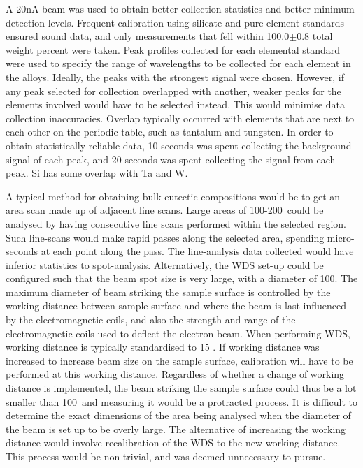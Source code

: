 A 20nA beam was used to obtain better collection statistics and better minimum detection levels.  Frequent calibration using silicate and pure element standards ensured sound data, and only measurements that fell within 100.0$\pm$0.8 total weight percent were taken.  Peak profiles collected for each elemental standard were used to specify the range of wavelengths to be collected for each element in the alloys.  Ideally, the peaks with the strongest signal were chosen.  However, if any peak selected for collection overlapped with another, weaker peaks for the elements involved would have to be selected instead.  This would minimise data collection inaccuracies.  Overlap typically occurred with elements that are next to each other on the periodic table, such as tantalum and tungsten.  In order to obtain statistically reliable data, 10 seconds was spent collecting the background signal of each peak, and 20 seconds was spent collecting the signal from each peak.  Si has some overlap with Ta and W. 

A typical method for obtaining bulk eutectic compositions would be to get an area scan made up of adjacent line scans.  Large areas of 100-200\micro\square\metre\ could be analysed by having consecutive line scans performed within the selected region.  Such line-scans would make rapid passes along the selected area, spending micro-seconds at each point along the pass.  The line-analysis data collected would have inferior statistics to spot-analysis.  Alternatively, the WDS set-up could be configured such that the beam spot size is very large, with a diameter of 100\micro\metre.  The maximum diameter of beam striking the sample surface is controlled by the working distance between sample surface and where the beam is last influenced by the electromagnetic coils, and also the strength and range of the electromagnetic coils used to deflect the electron beam.  When performing WDS, working distance is typically standardised to 15 \centi\metre.  If working distance was increased to increase beam size on the sample surface, calibration will have to be performed at this working distance.  Regardless of whether a change of working distance is implemented, the beam striking the sample surface could thus be a lot smaller than 100\micro\metre\ and measuring it would be a protracted process.  It is difficult to determine the exact dimensions of the area being analysed when the diameter of the beam is set up to be overly large.  The alternative of increasing the working distance would involve recalibration of the WDS to the new working distance.  This process would be non-trivial, and was deemed unnecessary to pursue.

